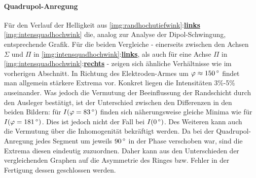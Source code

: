 \documentclass[numbers=noenddot,a4paper,notitlepage,twoside,BCOR15mm]{scrbook}
\newcommand{\degree}{^\circ}
\newcommand{\fett}[1]{\textbf{#1}}
\begin{document}
				\paragraph{Quadrupol-Anregung}

					Für den Verlauf der Helligkeit aus \autoref{img:randhochutiefwink}:\underline{\fett{links}} \autoref{img:intensquadhochwink} die, analog zur Analyse der Dipol-Schwingung, entsprechende Grafik. Für die beiden Vergleiche - einerseits zwischen den Achsen $\Sigma$ und $\Pi$ in \autoref{img:intensquadhochwink}:\underline{\fett{links}}, als auch für eine Achse $\Pi$ in \autoref{img:intensquadhochwink}:\underline{\fett{rechts}} - zeigen sich ähnliche Verhältnisse wie im vorherigen Abschnitt. In Richtung des Elektroden-Armes um $\varphi\approx\unit[150]{\degree}$ findet man allgemein stärkere Extrema vor. Konkret liegen die Intensitäten 3\%-5\% auseinander. Was jedoch die Vermutung der Beeinflussung der Randschicht durch den Ausleger bestätigt, ist der Unterschied zwischen den Differenzen in den beiden Bildern: für $I(\varphi=\unit[83]{\degree})$ finden sich näherungsweise gleiche Minima wie für $I(\varphi=\unit[181]{\degree})$. Dies ist jedoch nicht der Fall bei $I(\unit[0]{\degree})$. Des Weiteren kann auch die Vermutung über die Inhomogenität bekräftigt werden. Da bei der Quadrupol-Anregung jedes Segment um jeweils $\unit[90]{\degree}$ in der Phase verschoben war, sind die Extrema diesen eindeutig zuzuordnen. Daher kann aus den Unterschieden der vergleichenden Graphen auf die Asymmetrie des Ringes bzw. Fehler in der Fertigung dessen geschlossen werden.
\end{document}
